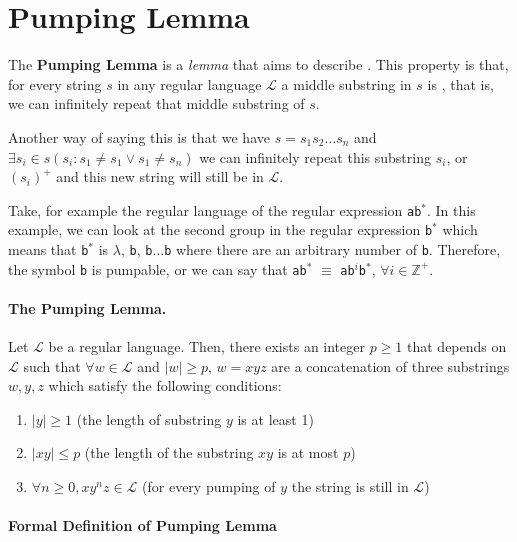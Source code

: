 \section{Pumping Lemma}
\label{pumping_lemma_chapter}

The \textbf{Pumping Lemma} is a \textit{lemma} that aims to describe . This property is that, for every string $s$ in any regular language $\mathcal{L}$ a middle substring in $s$ is , that is, we can infinitely repeat that middle substring of $s$.

Another way of saying this is that we have $s=s_1 s_2 \dots s_n$ and $\exists s_i\in s(s_i:s_1 \neq s_1 \vee s_1 \neq s_n)$ we can infinitely repeat this substring $s_i$, or $(s_i)^+$ and this new string will still be in $\mathcal{L}$.

Take, for example the regular language of the regular expression \texttt{ab$^*$}. In this example, we can look at the second group in the regular expression \texttt{b$^*$} which means that \texttt{b$^*$} is $\lambda$, \texttt{b}, \texttt{b$\dots$b} where there are an arbitrary number of \texttt{b}. Therefore, the symbol \texttt{b} is pumpable, or we can say that \texttt{ab$^*$} $\equiv$ \texttt{ab$^i$b$^*$}, $\forall i \in \mathbb{Z}^+$.

\paragraph{The Pumping Lemma.} 
\label{pumping_lemma_defn}

Let $\mathcal{L}$ be a regular language. Then, there exists an integer $p \geq 1$ that depends on $\mathcal{L}$ such that $\forall w\in \mathcal{L}$ and $|w| \geq p$, $w=xyz$ are a concatenation of three substrings $w,y,z$ which satisfy the following conditions:

\begin{enumerate}
    \item $|y|\geq  1$ (the length of substring $y$ is at least 1)
    \item $|xy| \leq p$ (the length of the substring $xy$ is at most $p$)
    \item $\forall n\geq 0,xy^nz\in \mathcal{L}$ (for every pumping of $y$ the string is still in $\mathcal{L}$)
\end{enumerate}

\paragraph{Formal Definition of Pumping Lemma}
\label{pumping_lemma_formal}

